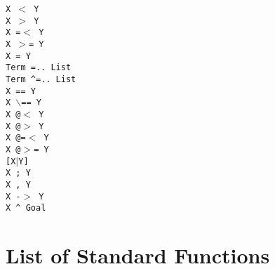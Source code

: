\begin{tabbing}
 \> {\tt X $<$ Y}		\>					\\
 \> {\tt X $>$ Y}		\>					\\
 \> {\tt X =$<$ Y}		\>					\\
 \> {\tt X $>$= Y}		\>					\\
 \> {\tt X = Y}			\>					\\
 \> {\tt Term =.. List}		\>					\\
 \> {\tt Term \verb'^'=.. List}	\>					\\
 \> {\tt X == Y}		\>					\\
 \> {\tt X $\backslash$== Y}	\>					\\
 \> {\tt X @$<$ Y}		\>					\\
 \> {\tt X @$>$ Y}		\>					\\
 \> {\tt X @=$<$ Y}		\>					\\
 \> {\tt X @$>$= Y}		\>					\\
 \> {\tt [X$|$Y]}		\>					\\
 \> {\tt X ; Y}			\>					\\
 \> {\tt X , Y}			\>					\\
 \> {\tt X -$>$ Y}		\>					\\
 \> {\tt X \verb'^' Goal}	\>					\\
\end{tabbing}



\section{List of Standard Functions}

